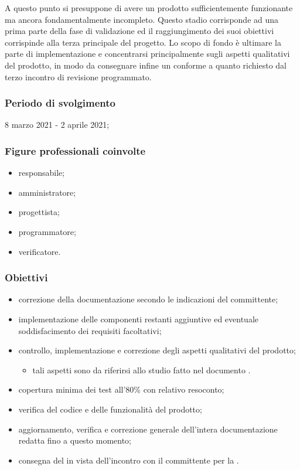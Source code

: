 A questo punto si presuppone di avere un prodotto sufficientemente funzionante ma ancora fondamentalmente incompleto. Questo stadio corrisponde ad una prima parte della fase di validazione ed il raggiungimento dei suoi obiettivi corrispinde alla terza  principale del progetto. Lo scopo di fondo è ultimare la parte di implementazione e concentrarsi principalmente sugli aspetti qualitativi del prodotto, in modo da consegnare infine un  conforme a quanto richiesto dal terzo incontro di revisione programmato.
        
        \subsubsection{Periodo di svolgimento}
        8 marzo 2021 - 2 aprile 2021;
        
        \subsubsection{Figure professionali coinvolte}
            \begin{itemize}
                \item responsabile;
                \item amministratore;
                \item progettista;
                \item programmatore;
                \item verificatore.
            \end{itemize}

        \subsubsection{Obiettivi}
        \begin{itemize}
            \item correzione della documentazione secondo le indicazioni del committente;
            \item implementazione delle componenti restanti aggiuntive ed eventuale soddisfacimento dei requisiti facoltativi;
            \item controllo, implementazione e correzione degli aspetti qualitativi del prodotto;
            \begin{itemize}
                \item tali aspetti sono da riferirsi allo studio fatto nel documento \PdQ{}. %
            \end{itemize}
            \item copertura minima dei test all'80\% con relativo resoconto;
            \item verifica del codice e delle funzionalità del prodotto;
            \item aggiornamento, verifica e correzione generale dell'intera documentazione redatta fino a questo momento;
            \item consegna del  in vista dell'incontro con il committente per la \RQ{}.
        \end{itemize}